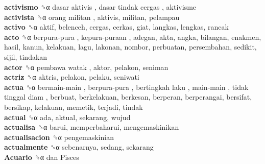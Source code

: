 \textbf{activismo} ␝α   dasar aktivis ,  dasar tindak cergas , aktivisme  \\
\textbf{activista} ␝α   orang militan , aktivis, militan, pelampau  \\
\textbf{activo} ␝α  aktif, belenceh, cergas, cerkas, giat, langkas, lengkas, rancak  \\
\textbf{acto} ␝α   berpura-pura ,  kepura-puraan , adegan, akta, angka, bilangan, enakmen, hasil, kanun, kelakuan, lagu, lakonan, nombor, perbuatan, persembahan, sedikit, sijil, tindakan  \\
\textbf{actor} ␝α   pembawa watak , aktor, pelakon, seniman  \\
\textbf{actriz} ␝α  aktris, pelakon, pelaku, seniwati  \\
\textbf{actua} ␝α   bermain-main ,  berpura-pura ,  bertingkah laku ,  main-main ,  tidak tinggal diam , berbuat, berkelakuan, berkesan, berperan, berperangai, bersifat, bersikap, kelakuan, memetik, terjadi, tindak  \\
\textbf{actual} ␝α  ada, aktual, sekarang, wujud  \\
\textbf{actualisa} ␝α  barui, memperbaharui, mengemaskinikan  \\
\textbf{actualisacion} ␝α  pengemaskinian  \\
\textbf{actualmente} ␝α  sebenarnya, sedang, sekarang  \\
\textbf{Acuario} ␝α   dan Pisces   \\
